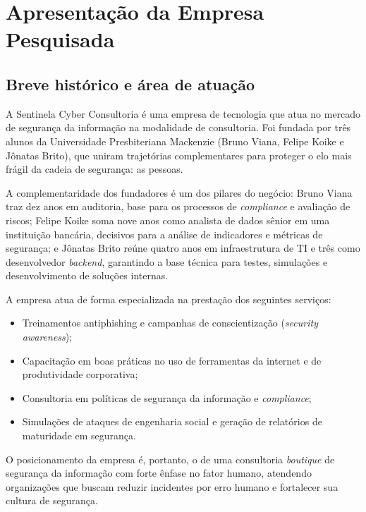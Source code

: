 \documentclass[12pt,a4paper]{article}
\begin{document}
\section{Apresentação da Empresa Pesquisada}

\subsection{Breve histórico e área de atuação}

A Sentinela Cyber Consultoria é uma empresa de tecnologia que atua no mercado
de segurança da informação na modalidade de consultoria. Foi fundada por três
alunos da Universidade Presbiteriana Mackenzie (Bruno Viana, Felipe Koike e
Jônatas Brito), que uniram trajetórias complementares para proteger o elo mais
frágil da cadeia de segurança: as pessoas.

A complementaridade dos fundadores é um dos pilares do negócio: Bruno Viana
traz dez anos em auditoria, base para os processos de \textit{compliance} e
avaliação de riscos; Felipe Koike soma nove anos como analista de dados sênior
em uma instituição bancária, decisivos para a análise de indicadores e métricas
de segurança; e Jônatas Brito reúne quatro anos em infraestrutura de TI e três
como desenvolvedor \textit{backend}, garantindo a base técnica para testes,
simulações e desenvolvimento de soluções internas.

A empresa atua de forma especializada na prestação dos seguintes serviços:

\begin{itemize}[noitemsep]
  \item Treinamentos antiphishing e campanhas de conscientização (\textit{security awareness});
  \item Capacitação em boas práticas no uso de ferramentas da internet e de produtividade corporativa;
  \item Consultoria em políticas de segurança da informação e \textit{compliance};
  \item Simulações de ataques de engenharia social e geração de relatórios de maturidade em segurança.
\end{itemize}

O posicionamento da empresa é, portanto, o de uma consultoria \textit{boutique}
de segurança da informação com forte ênfase no fator humano, atendendo
organizações que buscam reduzir incidentes por erro humano e fortalecer sua
cultura de segurança.
\end{document}
